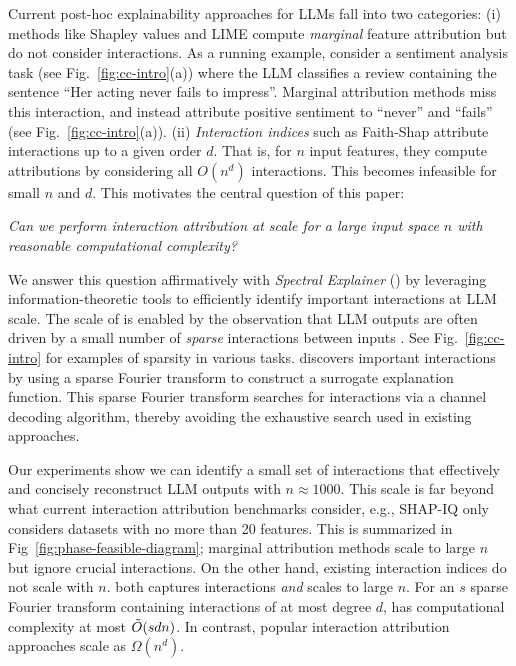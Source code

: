 Current post-hoc explainability approaches for LLMs fall into two categories: (i) methods like Shapley values \cite{Lundberg2017} and LIME \cite{ribeiro2016should} compute \textit{marginal} feature attribution but do not consider interactions.
%
As a running example, 
consider a sentiment analysis task (see Fig.~\ref{fig:cc-intro}(a)) where the LLM classifies a review containing the sentence ``Her acting never fails to impress''.
%
Marginal attribution methods miss this interaction, and instead attribute positive sentiment to ``never'' and ``fails'' (see Fig.~\ref{fig:cc-intro}(a)).
%
(ii) \textit{Interaction indices} such as Faith-Shap \cite{tsai2023faith} attribute interactions up to a given order $d$.
%
That is, for $n$ input features, they compute attributions by considering all $O(n^d)$ interactions.
%
This becomes infeasible for small $n$ and $d$. This motivates the central question of this paper: 
\begin{center}
{\textit{Can we perform interaction attribution at scale for a large input space $n$ with reasonable computational complexity? }}
\end{center}
We answer this question affirmatively with \emph{Spectral Explainer} (\SpecExp{}) by leveraging information-theoretic tools to efficiently identify important interactions at LLM scale. 
%
The scale of \SpecExp{}  is enabled by the observation that LLM outputs are often driven by a small number of \emph{sparse} interactions between inputs \cite{tsui2024on, ren2024where}. 
%
See Fig.~\ref{fig:cc-intro} for examples of sparsity in various tasks. 
%
\SpecExp{} discovers important interactions by using a sparse Fourier transform to construct a surrogate explanation function.
%
This sparse Fourier transform searches for interactions via a channel decoding algorithm, thereby avoiding the exhaustive search used in existing approaches.


%
Our experiments show we can identify a small set of interactions that effectively and concisely reconstruct LLM outputs with $n \approx 1000$.  
%
This scale is far beyond what current interaction attribution benchmarks consider, e.g., SHAP-IQ \cite{muschalik2024shapiq} only considers datasets with no more than 20 features. 
%
This is summarized in Fig~\ref{fig:phase-feasible-diagram}; marginal attribution methods scale to large $n$ but ignore crucial interactions.
%
On the other hand, existing interaction indices do not scale with $n$. \SpecExp{}  both  captures interactions \emph{and} scales to large $n$. For an $s$ sparse Fourier transform containing interactions of at most degree $d$, \SpecExp{} has computational complexity at most $\Tilde{O}(sdn)$. In contrast, popular interaction attribution approaches scale as $\Omega(n^d)$.

